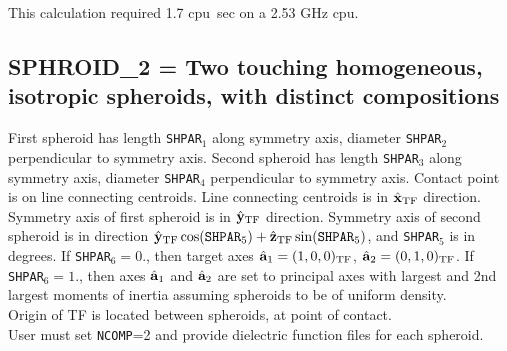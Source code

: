 This calculation required 1.7 cpu~sec on a 2.53 GHz cpu.

\subsection{ SPHROID\_2 = Two touching homogeneous, isotropic spheroids,
	   with distinct compositions
           \label{sec:SPHROID_2}}
	First spheroid has length {\tt SHPAR$_1$} along symmetry axis, 
        diameter {\tt SHPAR$_2$} perpendicular to symmetry axis.
	Second spheroid has length {\tt SHPAR}$_3$ along symmetry axis, 
	diameter {\tt SHPAR}$_4$ perpendicular to symmetry axis.  
	Contact point is on line connecting centroids.  
	Line connecting centroids is in $\hat{\bf x}_{\rm TF}$ direction.
	Symmetry axis of first spheroid is in $\hat{\bf y}_{\rm TF}$ direction.  
	Symmetry axis of second spheroid is in direction 
	$\hat{\bf y}_{\rm TF}\cos({\tt SHPAR}_5)+\hat{\bf z}_{\rm TF}\sin({\tt SHPAR}_5)$,
	and {\tt SHPAR}$_5$ is in degrees.  
	If {\tt SHPAR}$_6=0.$, then target axes ${\hat{\bf a}}_1=(1,0,0)_{\rm TF}$,
	${\hat{\bf a}}_2=(0,1,0)_{\rm TF}$. 
	If {\tt SHPAR}$_6=1.$, then axes ${\hat{\bf a}}_1$ and 
        ${\hat{\bf a}}_2$ are set to 
	principal axes with largest and 2nd largest moments of inertia assuming
	spheroids to be of uniform density.\\
	Origin of TF is located between spheroids, at point of contact.\\
	User must set {\tt NCOMP}=2 and provide dielectric function files for 
	each spheroid.
